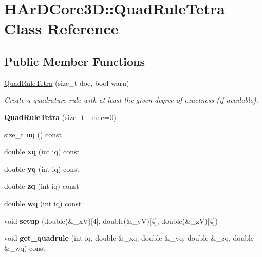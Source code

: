 \hypertarget{classHArDCore3D_1_1QuadRuleTetra}{}\section{H\+Ar\+D\+Core3D\+:\+:Quad\+Rule\+Tetra Class Reference}
\label{classHArDCore3D_1_1QuadRuleTetra}
\subsection*{Public Member Functions}
\begin{DoxyCompactItemize}
\item 
\hyperlink{classHArDCore3D_1_1QuadRuleTetra_aa9690d2663c19c67d52b3cd176afa4b9}{Quad\+Rule\+Tetra} (size\+\_\+t doe, bool warn)
\begin{DoxyCompactList}\small\item\em Create a quadrature rule with at least the given degree of exactness (if available). \end{DoxyCompactList}\item 
\mbox{\label{classHArDCore3D_1_1QuadRuleTetra_a7a95e2c4005af1f7dc71da864d1e79e3}} 
{\bfseries Quad\+Rule\+Tetra} (size\+\_\+t \+\_\+rule=0)
\item 
size\+\_\+t {\bfseries nq} () const
\item 
double {\bfseries xq} (int iq) const
\item 
double {\bfseries yq} (int iq) const
\item 
double {\bfseries zq} (int iq) const
\item 
double {\bfseries wq} (int iq) const
\item 
\mbox{\label{classHArDCore3D_1_1QuadRuleTetra_aa38c3a679cd52d2157653acb3013984b}} 
void {\bfseries setup} (double(\&\+\_\+xV)\mbox{[}4\mbox{]}, double(\&\+\_\+yV)\mbox{[}4\mbox{]}, double(\&\+\_\+zV)\mbox{[}4\mbox{]})
\item 
\mbox{\label{classHArDCore3D_1_1QuadRuleTetra_a0b28a2844825ec7d4f26678ddbb119f4}} 
void {\bfseries get\+\_\+quadrule} (int iq, double \&\+\_\+xq, double \&\+\_\+yq, double \&\+\_\+zq, double \&\+\_\+wq) const
\end{DoxyCompactItemize}
